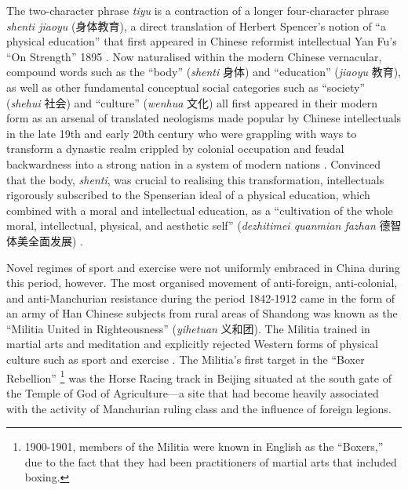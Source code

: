 \begin{CJK}{UTF8}{gbsn}
The two-character phrase \textit{tiyu} is a contraction of a longer four-character phrase \textit{shenti jiaoyu} (身体教育), a direct translation of Herbert Spencer’s notion of  ``a physical education'' that first appeared in Chinese reformist intellectual Yan Fu’s ``On Strength'' 1895 \citep[9-10]{Morris2004}.  Now naturalised within the modern Chinese vernacular, compound words such as the ``body'' (\textit{shenti} 身体) and ``education'' (\textit{jiaoyu} 教育), as well as other fundamental conceptual social categories such as ``society'' (\textit{shehui} 社会) and ``culture'' (\textit{wenhua} 文化) all first appeared in their modern form as an arsenal of translated neologisms made popular by Chinese intellectuals in the late 19th and early 20th century who were grappling with ways to transform a dynastic realm crippled by colonial occupation and feudal backwardness into a strong nation in a system of modern nations \citep{Pusey1983;Liu1995;Huters2005}.   Convinced that the body, \textit{shenti}, was crucial to realising this transformation, intellectuals rigorously subscribed to the Spenserian ideal of a physical education, which combined with a moral and intellectual education, as a ``cultivation of the whole moral, intellectual, physical, and aesthetic self'' (\textit{dezhitimei quanmian fazhan} 德智体美全面发展) \citep[10]{Morris2004}.

Novel regimes of sport and exercise were not uniformly embraced in China during this period, however.  The most organised movement of anti-foreign, anti-colonial, and anti-Manchurian resistance during the period 1842-1912 came in the form of an army of Han Chinese subjects from rural areas of Shandong was known as the ``Militia United in Righteousness'' (\textit{yihetuan} 义和团).  The Militia trained in martial arts and meditation and explicitly rejected Western forms of physical culture such as sport and exercise \citep{Brownell2008}.  The Militia's first target in the ``Boxer Rebellion''
  \footnote{1900-1901, members of the Militia were known in English as the ``Boxers,'' due to the fact that they had been practitioners of martial arts that included boxing.}
was the Horse Racing track in Beijing situated at the south gate of the Temple of God of Agriculture---a site that had become heavily associated with the activity of Manchurian ruling class and the influence of foreign legions.


\end{CJK}
